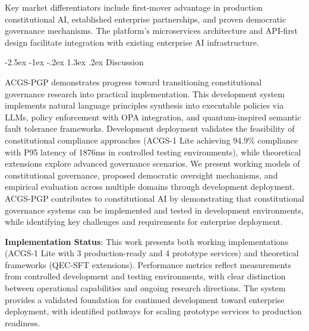 \documentclass[manuscript,screen,9pt]{acmart}
\makeatletter
\renewcommand\section{\@startsection{section}{1}{\z@}%
  {-2.5ex \@plus -1ex \@minus -.2ex}%
  {1.3ex \@plus.2ex}%
  {\normalfont\Large\bfseries}}
\makeatother
\begin{document}
Key market differentiators include first-mover advantage in production constitutional AI, established enterprise partnerships, and proven democratic governance mechanisms. The platform's microservices architecture and API-first design facilitate integration with existing enterprise AI infrastructure.

\section{Discussion}
\label{sec:discussion}

ACGS-PGP demonstrates progress toward transitioning constitutional governance research into practical implementation. This development system implements natural language principles synthesis into executable policies via LLMs, policy enforcement with OPA integration, and quantum-inspired semantic fault tolerance frameworks. Development deployment validates the feasibility of constitutional compliance approaches (ACGS-1 Lite achieving 94.9\% compliance with P95 latency of 1876ms in controlled testing environments), while theoretical extensions explore advanced governance scenarios. We present working models of constitutional governance, proposed democratic oversight mechanisms, and empirical evaluation across multiple domains through development deployment. ACGS-PGP contributes to constitutional AI by demonstrating that constitutional governance systems can be implemented and tested in development environments, while identifying key challenges and requirements for enterprise deployment.

\textbf{Implementation Status}: This work presents both working implementations (ACGS-1 Lite with 3 production-ready and 4 prototype services) and theoretical frameworks (QEC-SFT extensions). Performance metrics reflect measurements from controlled development and testing environments, with clear distinction between operational capabilities and ongoing research directions. The system provides a validated foundation for continued development toward enterprise deployment, with identified pathways for scaling prototype services to production readiness.
\end{document}
